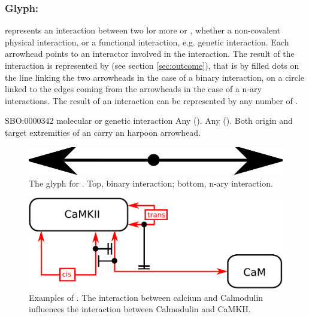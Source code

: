 \color{blue}

\subsubsection{Glyph: }\label{sec:interaction}

 represents an interaction between two lor more  or , whether a non-covalent physical interaction, or a functional interaction, e.g. genetic interaction. Each arrowhead points to an interactor involved in the interaction. The result of the interaction is represented by  (see section \ref{sec:outcome}), that is by filled dots on the line linking the two arrowheads in the case of a binary interaction, on a circle linked to the edges coming from the arrowheads in the case of a  n-ary interactions. The result of an interaction can be represented by any number of .

\begin{glyphDescription}
 \glyphSboTerm SBO:0000342 molecular or genetic interaction
 \glyphOrigin Any  ().
 \glyphTarget Any  ().
 \glyphEndPoint Both origin and target extremities of an  carry an harpoon arrowhead.
 \end{glyphDescription}

\begin{figure}[H]
  \centering
  \includegraphics[scale = 0.3]{images/interaction}
  \caption{The \ER glyph for . Top, binary interaction; bottom, n-ary interaction.}
  \label{fig:interaction}
\end{figure}

\begin{figure}[H]
  \centering
  \includegraphics[scale = 0.5]{examples/ex-interaction}
  \caption{Examples of . The interaction between calcium and Calmodulin influences the interaction between Calmodulin and CaMKII.}
  \label{fig:ex-interaction}
\end{figure}


\normalcolor